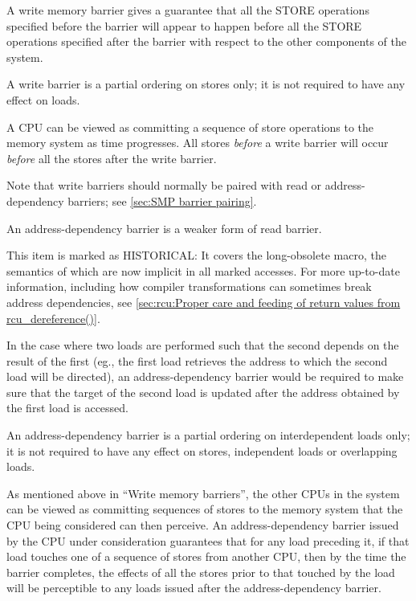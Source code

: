 \begin{description}[style=nextline]
 \item[Write (or store) memory barriers:]
     A write memory barrier gives a guarantee that all the STORE operations
     specified before the barrier will appear to happen before all the STORE
     operations specified after the barrier with respect to the other
     components of the system.

     A write barrier is a partial ordering on stores only; it is not required
     to have any effect on loads.

     A CPU can be viewed as committing a sequence of store operations to the
     memory system as time progresses.
     All stores \emph{before} a write barrier will occur \emph{before} all
     the stores after the write barrier.

     \begin{Note}
     Note that write barriers should normally be paired with read or
     address-dependency barriers; see \cref{sec:SMP barrier pairing}.
     \end{Note}


 \item[Address-dependency barriers (HISTORICAL):]
     An address-dependency barrier is a weaker form of read barrier.

     \begin{Note}
     This item is marked as HISTORICAL\@:
     It covers the long-obsolete  macro,
     the semantics of which are now implicit in all marked accesses.
     For more up-to-date information, including how compiler transformations
     can sometimes break address dependencies, see
     \cref{sec:rcu:Proper care and feeding of return values from rcu_dereference()}.
     \end{Note}

     In the case where two loads are performed such that the second depends
     on the result of the first (eg., the first load retrieves the address
     to which the second load will be directed), an address-dependency
     barrier would be required to make sure that the target of the second
     load is updated after the address obtained by the first load is
     accessed.

     An address-dependency barrier is a partial ordering on interdependent
     loads only; it is not required to have any effect on stores, independent
     loads or overlapping loads.

     As mentioned above in ``Write memory barriers'',
     the other CPUs in the system can be viewed as
     committing sequences of stores to the memory system that the CPU being
     considered can then perceive.
     An address-dependency barrier issued by the CPU under consideration
     guarantees that for any load preceding it, if that load touches one of
     a sequence of stores from another CPU, then by the time the barrier
     completes, the effects of all the stores prior to that touched by the
     load will be perceptible to any loads issued after the
     address-dependency barrier.


\end{description}

